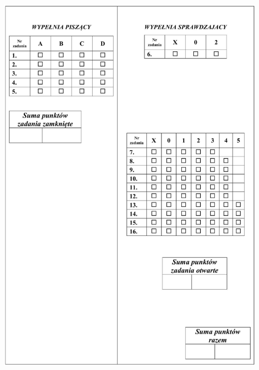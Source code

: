 \documentclass[10pt]{article}
\begin{document}
\includegraphics[max width=\textwidth, center]{2024_11_21_12a27a32a51fef2c834ag-16}
\end{document}
